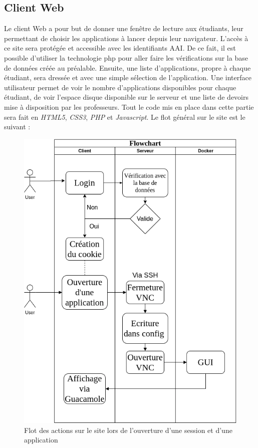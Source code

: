 \subsection{Client Web}
Le client Web a pour but de donner une fenêtre de lecture aux étudiants, leur permettant de choisir les applications à lancer depuis leur navigateur.
L'accès à ce site sera protégée et accessible avec les identifiants AAI. 
De ce fait, il est possible d'utiliser la technologie php pour aller faire les vérifications sur la base de données créée au préalable.
Ensuite, une liste d'applications, propre à chaque étudiant, sera dressée et avec une simple sélection de l'application.
Une interface utilisateur permet de voir le nombre d'applications disponibles pour chaque étudiant, de voir l'espace disque disponible sur le serveur et une liste de devoirs mise à disposition par les professeurs.
Tout le code mis en place dans cette partie sera fait en \textit{HTML5}, \textit{CSS3}, \textit{PHP} et \textit{Javascript}.
Le flot général sur le site est le suivant :
\begin{figure}[H]
	\centering
	\includegraphics[scale=0.35]{images/client_flow.png}
	\caption{Flot des actions sur le site lors de l'ouverture d'une session et d'une application}
	\label{fig:client_flow}
\end{figure}

